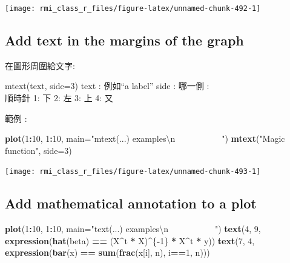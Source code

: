 \documentclass[]{book}
\newenvironment{Shaded}{\begin{snugshade}}{\end{snugshade}}
\newcommand{\CharTok}[1]{\textcolor[rgb]{0.31,0.60,0.02}{#1}}
\newcommand{\DataTypeTok}[1]{\textcolor[rgb]{0.13,0.29,0.53}{#1}}
\newcommand{\DecValTok}[1]{\textcolor[rgb]{0.00,0.00,0.81}{#1}}
\newcommand{\KeywordTok}[1]{\textcolor[rgb]{0.13,0.29,0.53}{\textbf{#1}}}
\newcommand{\NormalTok}[1]{#1}
\newcommand{\OperatorTok}[1]{\textcolor[rgb]{0.81,0.36,0.00}{\textbf{#1}}}
\newcommand{\StringTok}[1]{\textcolor[rgb]{0.31,0.60,0.02}{#1}}
\theoremstyle{definition}
\theoremstyle{definition}
\theoremstyle{definition}
\theoremstyle{remark}
\begin{document}
\begin{center}\texttt{[image: rmi\_class\_r\_files/figure-latex/unnamed-chunk-492-1]} \end{center}

\hypertarget{add-text-in-the-margins-of-the-graph}{%
\subsection{Add text in the margins of the
graph}\label{add-text-in-the-margins-of-the-graph}}

在圖形周圍給文字:

mtext(text, side=3) text : 例如``a label'' side : 哪一側 :\\
順時針 1: 下 2: 左 3: 上 4: 又

範例 :

\begin{Shaded}
\begin{Highlighting}[]
\KeywordTok{plot}\NormalTok{(}\DecValTok{1}\OperatorTok{:}\DecValTok{10}\NormalTok{, }\DecValTok{1}\OperatorTok{:}\DecValTok{10}\NormalTok{, }
     \DataTypeTok{main=}\StringTok{"mtext(...) examples}\CharTok{\textbackslash{}n}\StringTok{~~~~~~~~~~~"}\NormalTok{)}
\KeywordTok{mtext}\NormalTok{(}\StringTok{"Magic function"}\NormalTok{, }\DataTypeTok{side=}\DecValTok{3}\NormalTok{)}
\end{Highlighting}
\end{Shaded}

\begin{center}\texttt{[image: rmi\_class\_r\_files/figure-latex/unnamed-chunk-493-1]} \end{center}

\hypertarget{add-mathematical-annotation-to-a-plot}{%
\subsection{Add mathematical annotation to a
plot}\label{add-mathematical-annotation-to-a-plot}}

\begin{Shaded}
\begin{Highlighting}[]
\KeywordTok{plot}\NormalTok{(}\DecValTok{1}\OperatorTok{:}\DecValTok{10}\NormalTok{, }\DecValTok{1}\OperatorTok{:}\DecValTok{10}\NormalTok{, }
     \DataTypeTok{main=}\StringTok{"text(...) examples}\CharTok{\textbackslash{}n}\StringTok{~~~~~~~~~~~"}\NormalTok{)}
\KeywordTok{text}\NormalTok{(}\DecValTok{4}\NormalTok{, }\DecValTok{9}\NormalTok{, }\KeywordTok{expression}\NormalTok{(}\KeywordTok{hat}\NormalTok{(beta) }\OperatorTok{==}\StringTok{ }\NormalTok{(X}\OperatorTok{^}\NormalTok{t }\OperatorTok{*}\StringTok{ }\NormalTok{X)}\OperatorTok{^}\NormalTok{\{}\OperatorTok{-}\DecValTok{1}\NormalTok{\} }\OperatorTok{*}\StringTok{ }\NormalTok{X}\OperatorTok{^}\NormalTok{t }\OperatorTok{*}\StringTok{ }\NormalTok{y))}
\KeywordTok{text}\NormalTok{(}\DecValTok{7}\NormalTok{, }\DecValTok{4}\NormalTok{, }\KeywordTok{expression}\NormalTok{(}\KeywordTok{bar}\NormalTok{(x) }\OperatorTok{==}\StringTok{ }\KeywordTok{sum}\NormalTok{(}\KeywordTok{frac}\NormalTok{(x[i], n), i}\OperatorTok{==}\DecValTok{1}\NormalTok{, n)))}
\end{Highlighting}
\end{Shaded}
\end{document}
